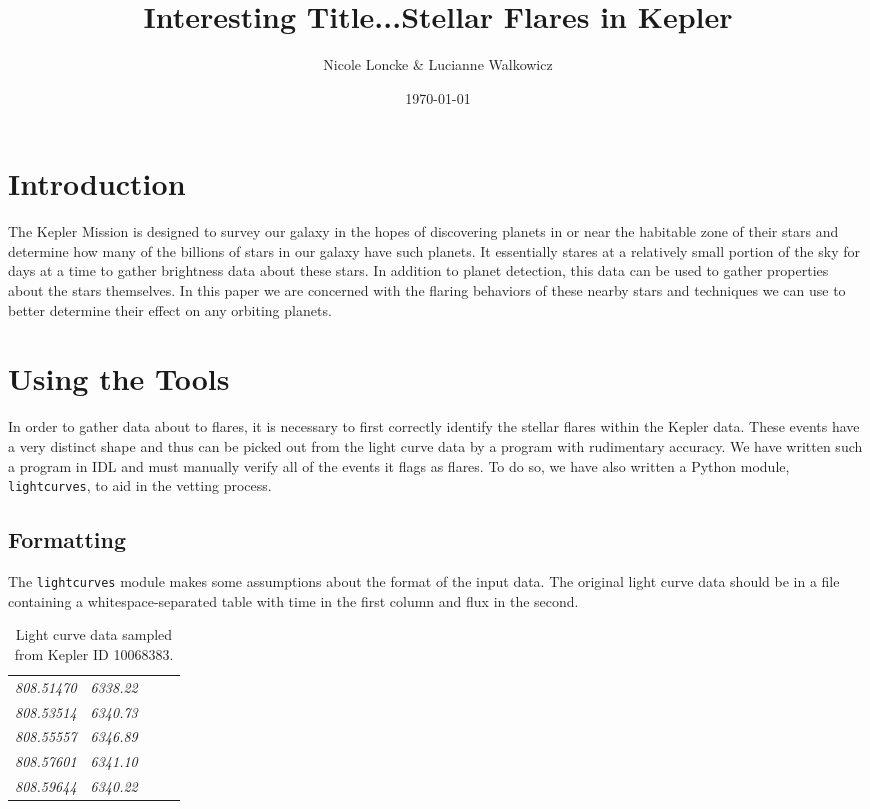\documentclass[11pt]{article}
\author{Nicole Loncke \& Lucianne Walkowicz}
\date{\today}
\title{Interesting Title...Stellar Flares in Kepler}
\begin{document}
\maketitle{}

\section{Introduction}
\label{sec:intro}

The Kepler Mission is designed to survey our galaxy in the hopes of
discovering planets in or near the habitable zone of their stars and
determine how many of the billions of stars in our galaxy have such
planets. It essentially stares at a relatively small portion of the
sky for days at a time to gather brightness data about these stars.
In addition to planet detection, this data can be used to gather
properties about the stars themselves.  In this paper we are concerned
with the flaring behaviors of these nearby stars and techniques we can
use to better determine their effect on any orbiting planets.


\section{Using the Tools}
\label{sec:tools}
In order to gather data about to flares, it is necessary to first
correctly identify the stellar flares within the Kepler data.  These
events have a very distinct shape and thus can be picked out from the
light curve data by a program with rudimentary accuracy.  We have
written such a program in IDL and must manually verify all of the
events it flags as flares.  To do so, we have also written a Python
module, \verb|lightcurves|, to aid in the vetting process.

\subsection{Formatting}
\label{sec:format}

The \verb|lightcurves| module makes some assumptions about the format
of the input data.  The original light curve data should be in a file
containing a whitespace-separated table with time in the first column
and flux in the second.
\begin{table}[h]
  \centering
  \begin{tabular}{>{\itshape}p{0.2\linewidth} >{\itshape}l}
       808.51470   &   6338.22 \\
       808.53514   &   6340.73 \\
       808.55557   &   6346.89 \\
       808.57601   &   6341.10 \\
       808.59644   &   6340.22 \\
  \end{tabular}
  \caption{Light curve data sampled from Kepler ID 10068383.}
\end{table}
\end{document}
